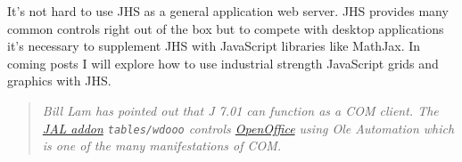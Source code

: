 It's not hard to use JHS as a general application web server. JHS
provides many common controls right out of the box but to compete with
desktop applications it's necessary to supplement JHS with JavaScript
libraries like MathJax. In coming posts I will explore how to use
industrial strength JavaScript grids and graphics with JHS.

\begin{quotation}
\emph{\small
Bill Lam has pointed out that J 7.01 can function as a COM client. 
The \href{http://www.jsoftware.com/jwiki/JAL}{JAL addon} \texttt{tables/wdooo} controls
\href{http://www.openoffice.org/}{OpenOffice} using Ole Automation
which is one of the many manifestations of COM.}
\end{quotation}








%